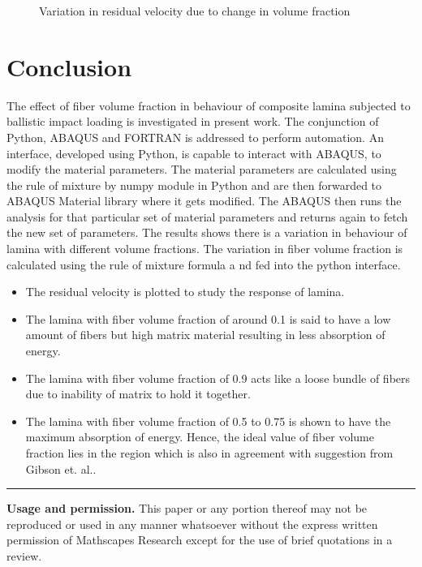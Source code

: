 \documentclass[a4paper,11pt, hidelinks]{article}
\begin{document}
\begin{figure}[h]
  \centering
  
  \caption{Variation in residual velocity due to change in volume fraction}
\end{figure}

\section{Conclusion}
The effect of fiber volume fraction in behaviour of composite lamina subjected to ballistic impact loading is investigated in present work. The conjunction of Python, ABAQUS and FORTRAN is addressed to perform automation. An interface, developed using Python, is capable to interact with ABAQUS, to modify the material parameters. The material parameters are calculated using the rule of mixture by numpy module in Python and are then forwarded to ABAQUS Material library where it gets modified. The ABAQUS then runs the analysis for that particular set of material parameters and returns again to fetch the new set of parameters. The results shows there is a variation in behaviour of lamina with different volume fractions.
The variation in fiber volume fraction is calculated using the rule of mixture formula a
nd fed into the python interface.

\begin{itemize}
    \item The residual velocity is plotted to study the response of lamina.
    \item The lamina with fiber volume fraction of around 0.1 is said to have a low amount of fibers but high matrix material resulting in less absorption of energy.
    \item The lamina with fiber volume fraction of 0.9 acts like a loose bundle of fibers due to inability of matrix to hold it together.
    \item The lamina with fiber volume fraction of 0.5 to 0.75 is shown to have the maximum absorption of energy. Hence, the ideal value of fiber volume fraction lies in the region which is also in agreement with suggestion from Gibson et. al.\cite{Gibson1994}.
\end{itemize}




\vspace*{\fill}
\rule{\textwidth}{0.4pt}
\footnotesize \textbf{Usage and permission.} This paper or any portion thereof may not be reproduced or used in any manner whatsoever without the express written permission of Mathscapes Research except for the use of brief quotations in a review.
\end{document}
